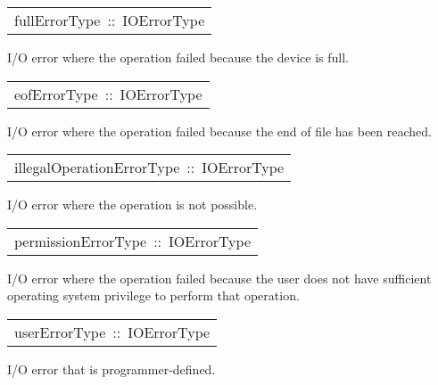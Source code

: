 \begin{haddockdesc}
\item[\begin{tabular}{@{}l}
fullErrorType\ ::\ IOErrorType
\end{tabular}]\haddockbegindoc
I/O error where the operation failed because the device is full.
\par

\end{haddockdesc}
\begin{haddockdesc}
\item[\begin{tabular}{@{}l}
eofErrorType\ ::\ IOErrorType
\end{tabular}]\haddockbegindoc
I/O error where the operation failed because the end of file has
 been reached.
\par

\end{haddockdesc}
\begin{haddockdesc}
\item[\begin{tabular}{@{}l}
illegalOperationErrorType\ ::\ IOErrorType
\end{tabular}]\haddockbegindoc
I/O error where the operation is not possible.
\par

\end{haddockdesc}
\begin{haddockdesc}
\item[\begin{tabular}{@{}l}
permissionErrorType\ ::\ IOErrorType
\end{tabular}]\haddockbegindoc
I/O error where the operation failed because the user does not
 have sufficient operating system privilege to perform that operation.
\par

\end{haddockdesc}
\begin{haddockdesc}
\item[\begin{tabular}{@{}l}
userErrorType\ ::\ IOErrorType
\end{tabular}]\haddockbegindoc
I/O error that is programmer-defined.
\par

\end{haddockdesc}